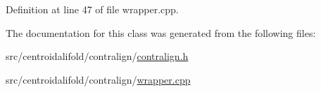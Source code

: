 Definition at line 47 of file wrapper.\+cpp.



The documentation for this class was generated from the following files\+:\begin{DoxyCompactItemize}
\item 
src/centroidalifold/contralign/\hyperlink{contralign_8h}{contralign.\+h}\item 
src/centroidalifold/contralign/\hyperlink{contralign_2wrapper_8cpp}{wrapper.\+cpp}\end{DoxyCompactItemize}
